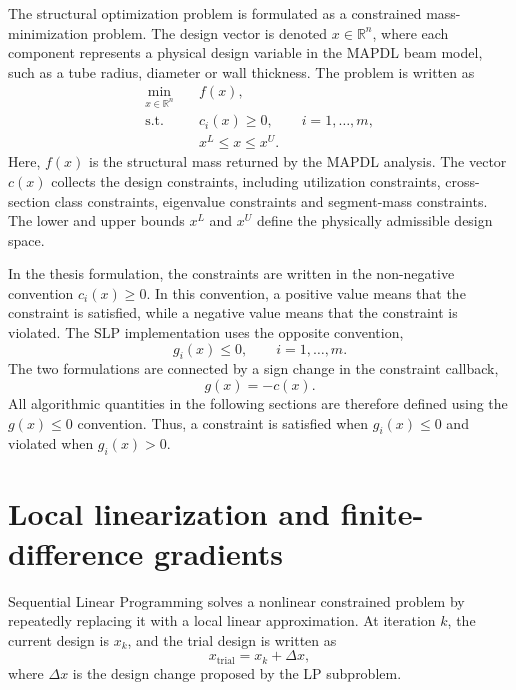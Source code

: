 The structural optimization problem is formulated as a constrained
mass-minimization problem. The design vector is denoted
$x \in \mathbb{R}^n$, where each component represents a physical
design variable in the MAPDL beam model, such as a tube radius,
diameter or wall thickness. The problem is written as
\begin{equation}
\label{eq:appA_problem}
\begin{aligned}
    \min_{x \in \mathbb{R}^n} \quad & f(x), \\
    \text{s.t.} \quad
    & c_i(x) \geq 0,
    \qquad i = 1,\dots,m, \\
    & x^L \leq x \leq x^U .
\end{aligned}
\end{equation}
Here, $f(x)$ is the structural mass returned by the MAPDL analysis.
The vector $c(x)$ collects the design constraints, including
utilization constraints, cross-section class constraints,
eigenvalue constraints and segment-mass constraints. The lower and
upper bounds $x^L$ and $x^U$ define the physically admissible design
space.

In the thesis formulation, the constraints are written in the
non-negative convention $c_i(x) \geq 0$. In this convention, a
positive value means that the constraint is satisfied, while a
negative value means that the constraint is violated. The SLP
implementation uses the opposite convention,
\begin{equation}
\label{eq:appA_g_convention}
    g_i(x) \leq 0,
    \qquad i = 1,\dots,m .
\end{equation}
The two formulations are connected by a sign change in the constraint
callback,
\begin{equation}
\label{eq:appA_sign_flip}
    g(x) = -c(x).
\end{equation}
All algorithmic quantities in the following sections are therefore
defined using the $g(x) \leq 0$ convention. Thus, a constraint is
satisfied when $g_i(x) \leq 0$ and violated when $g_i(x)>0$.

\section{Local linearization and finite-difference gradients}
\label{sec:slpA:linearise}

Sequential Linear Programming solves a nonlinear constrained problem
by repeatedly replacing it with a local linear approximation. At
iteration $k$, the current design is $x_k$, and the trial design is
written as
\begin{equation}
\label{eq:appA_trial_design}
    x_{\text{trial}} = x_k + \Delta x ,
\end{equation}
where $\Delta x$ is the design change proposed by the LP subproblem.

